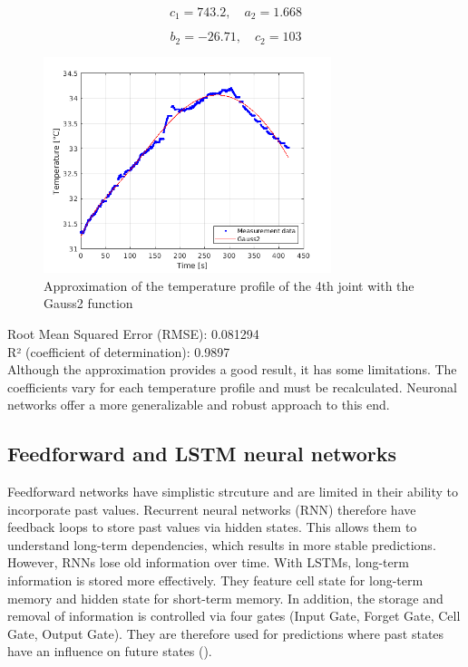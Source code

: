 \documentclass{ifacconf}
\begin{document}
\[
c_1 = 743.2, \quad a_2 = 1.668 
\]

\[
b_2 = -26.71, \quad c_2 = 103
\]

\begin{figure}[t]
  \begin{center}
  \includegraphics[width=8.4cm]{pictures/Gauss2_legend.png}    %
  \caption{Approximation of the temperature profile of the 4th joint with the Gauss2 function} 
  \label{fig:Gauss2_legend}
  \end{center}
\end{figure}
Root Mean Squared Error (RMSE): 0.081294\\
R² (coefficient of determination): 0.9897\\

Although the approximation provides a good result, it has some limitations. 
The coefficients vary for each temperature profile and must be recalculated. 
Neuronal networks offer a more generalizable and robust approach to this end.


\subsection{Feedforward and LSTM neural networks}
Feedforward networks have simplistic strcuture and are limited in their ability to incorporate past values. 
Recurrent neural networks (RNN) therefore have feedback loops to store past values via hidden states. This allows them to understand long-term dependencies, which results in more stable predictions.
However, RNNs lose old information over time. With LSTMs, long-term information is stored more effectively. They feature cell state for long-term memory and hidden state for short-term memory. In addition, the storage and removal of information is controlled via four gates (Input Gate, Forget Gate, Cell Gate, Output Gate).  
They are therefore used for predictions where past states have an influence on future states (\cite{Ljung}).
\end{document}
